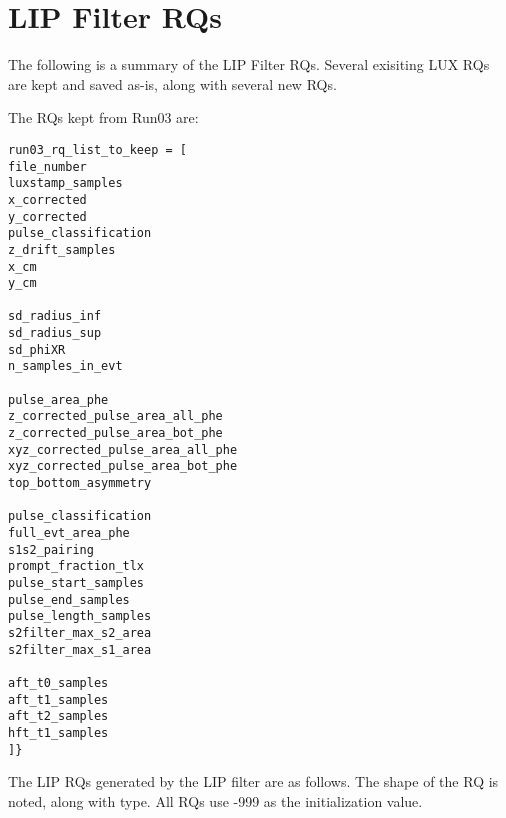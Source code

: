 
\chapter{LIP Filter RQs}

\label{app:lipfilter}

The following is a summary of the \ac{LIP} Filter \ac{RQ}s. Several  exisiting \ac{LUX} \ac{RQ}s are kept and saved as-is, along with several new \ac{RQ}s. 

The \ac{RQ}s kept from Run03 are:

\begin{Verbatim}[fontsize=\footnotesize]
run03_rq_list_to_keep = [
file_number
luxstamp_samples
x_corrected
y_corrected
pulse_classification
z_drift_samples
x_cm
y_cm

sd_radius_inf
sd_radius_sup
sd_phiXR
n_samples_in_evt

pulse_area_phe
z_corrected_pulse_area_all_phe
z_corrected_pulse_area_bot_phe
xyz_corrected_pulse_area_all_phe
xyz_corrected_pulse_area_bot_phe
top_bottom_asymmetry

pulse_classification
full_evt_area_phe
s1s2_pairing
prompt_fraction_tlx
pulse_start_samples
pulse_end_samples
pulse_length_samples
s2filter_max_s2_area
s2filter_max_s1_area

aft_t0_samples
aft_t1_samples
aft_t2_samples
hft_t1_samples
]}
\end{Verbatim}

The \ac{LIP} \ac{RQ}s generated by the \ac{LIP} filter are as follows. The shape of the \ac{RQ} is noted, along with type. All \ac{RQ}s use -999 as the initialization value. 



